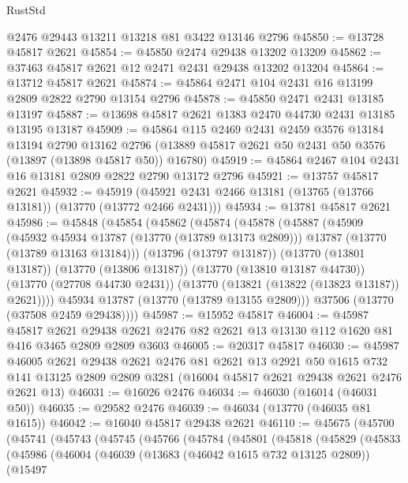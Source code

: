 \begin{lexlean}{RustStd}
\begin{coremodule}
    @2476
    @29443
    @13211
    @13218
    @81
    @3422
    @13146
    @2796
@45850 := @13728 @45817 @2621
@45854 := @45850 @2474 @29438 @13202 @13209
@45862 := @37463 @45817 @2621 @12 @2471 @2431 @29438 @13202 @13204
@45864 := @13712 @45817 @2621
@45874 := @45864 @2471 @104 @2431 @16 @13199 @2809 @2822 @2790 @13154 @2796
@45878 := @45850 @2471 @2431 @13185 @13197
@45887 := @13698 @45817 @2621 @1383 @2470 @44730 @2431 @13185 @13195 @13187
@45909 := @45864
    @115
    @2469
    @2431
    @2459
    @3576
    @13184
    @13194
    @2790
    @13162
    @2796
    (@13889 @45817 @2621 @50 @2431 @50 @3576 (@13897 (@13898 @45817 @50)) @16780)
@45919 := @45864 @2467 @104 @2431 @16 @13181 @2809 @2822 @2790 @13172 @2796
@45921 := @13757 @45817 @2621
@45932 := @45919 (@45921 @2431 @2466 @13181 (@13765 (@13766 @13181)) (@13770 (@13772 @2466 @2431)))
@45934 := @13781 @45817 @2621
@45986 := @45848
    (@45854
      (@45862
        (@45874
          (@45878
            (@45887
              (@45909
                (@45932 @45934 @13787 (@13770 (@13789 @13173 @2809)))
                @13787
                (@13770 (@13789 @13163 @13184)))
              (@13796 (@13797 @13187))
              (@13770 (@13801 @13187))
              (@13770 (@13806 @13187))
              (@13770 (@13810 @13187 @44730))
              (@13770 (@27708 @44730 @2431))
              (@13770 (@13821 (@13822 (@13823 @13187)) @2621))))
          @45934
          @13787
          (@13770 (@13789 @13155 @2809)))
        @37506
        (@13770 (@37508 @2459 @29438))))
@45987 := @15952 @45817
@46004 := @45987
    @45817
    @2621
    @29438
    @2621
    @2476
    @82
    @2621
    @13
    @13130
    @112
    @1620
    @81
    @416
    @3465
    @2809
    @2809
    @3603
@46005 := @20317 @45817
@46030 := @45987
    @46005
    @2621
    @29438
    @2621
    @2476
    @81
    @2621
    @13
    @2921
    @50
    @1615
    @732
    @141
    @13125
    @2809
    @2809
    @3281
    (@16004 @45817 @2621 @29438 @2621 @2476 @2621 @13)
@46031 := @16026 @2476
@46034 := @46030 (@16014 (@46031 @50))
@46035 := @29582 @2476
@46039 := @46034 (@13770 (@46035 @81 @1615))
@46042 := @16040 @45817 @29438 @2621
@46110 := @45675
    (@45700
      (@45741
        (@45743
          (@45745
            (@45766
              (@45784
                (@45801
                  (@45818
                    (@45829
                      (@45833
                        (@45986
                          (@46004
                            (@46039
                              (@13683 (@46042 @1615 @732 @13125 @2809))
                              (@15497

\end{coremodule}
\end{lexlean}

